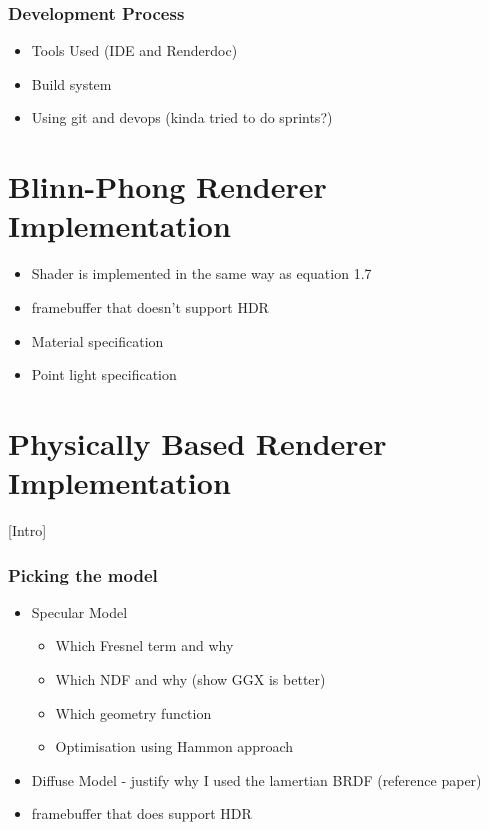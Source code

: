\subsubsection{Development Process}

\begin{itemize}
	\item Tools Used (IDE and Renderdoc)
	\item Build system
	\item Using git and devops (kinda tried to do sprints?)
\end{itemize}

\section{Blinn-Phong Renderer Implementation} \label{BlinnPhongImplementation}

\begin{itemize}
	\item Shader is implemented in the same way as equation 1.7
	\item framebuffer that doesn't support HDR
	\item Material specification
	\item Point light specification
\end{itemize}

\section{Physically Based Renderer Implementation} \label{PBRImplementation}

[Intro]

\subsubsection{Picking the model}

\begin{itemize}
	\item Specular Model
	\begin{itemize}
		\item Which Fresnel term and why
		\item Which NDF and why (show GGX is better)
		\item Which geometry function
		\item Optimisation using Hammon approach
	\end{itemize}
	\item Diffuse Model - justify why I used the lamertian BRDF (reference paper)
	\item framebuffer that does support HDR
\end{itemize}

